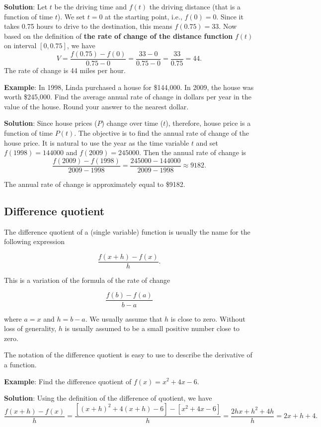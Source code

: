 \documentclass[
]{book}
\begin{document}
\textbf{Solution}: Let \(t\) be the driving time and \(f(t)\) the driving distance (that is a function of time \(t\)). We set \(t=0\) at the starting point, i.e., \(f(0)=0\). Since it takes 0.75 hours to drive to the destination, this means \(f(0.75) = 33\). Now based on the definition of \textbf{the rate of change of the distance function} \(f(t)\) on interval \([0, 0.75]\), we have \[
V = \frac{f(0.75) - f(0)}{0.75-0} = \frac{33-0}{0.75-0} = \frac{33}{0.75} = 44.
\] The rate of change is 44 miles per hour.

\textbf{Example}: In 1998, Linda purchased a house for \$144,000. In 2009, the house was worth \$245,000. Find the average annual rate of change in dollars per year in the value of the house. Round your answer to the nearest dollar.

\textbf{Solution}: Since house prices (\(P\)) change over time (\(t\)), therefore, house price is a function of time \(P(t)\). The objective is to find the annual rate of change of the house price. It is natural to use the year as the time variable \(t\) and set \(f(1998) = 144000\) and \(f(2009) = 245000\). Then the annual rate of change is \[
\frac{f(2009) - f(1998)}{2009 - 1998} = \frac{245000-144000}{2009-1998} \approx 9182.
\]

The annual rate of change is approximately equal to \$9182.

\hypertarget{difference-quotient-1}{%
\subsection{Difference quotient}\label{difference-quotient-1}}

The difference quotient of a (single variable) function is usually the name for the following expression

\[
\frac{f(x+h)-f(x)}{h}.
\]

This is a variation of the formula of the rate of change

\[
\frac{f(b)-f(a)}{b -a}
\]

where \(a = x\) and \(h = b -a\). We usually assume that \(h\) is close to zero. Without loss of generality, \(h\) is usually assumed to be a small positive number close to zero.

The notation of the difference quotient is easy to use to describe the derivative of a function.

\textbf{Example}: Find the difference quotient of \(f(x) = x^2 + 4x -6\).

\textbf{Solution}: Using the definition of the difference of quotient, we have
\[
\frac{f(x+h)-f(x)}{h} = \frac{[(x+h)^2 + 4(x+h) -6]-[x^2+4x-6]}{h}=\frac{2hx+h^2+4h}{h}=2x+h+4.
\]
\end{document}

